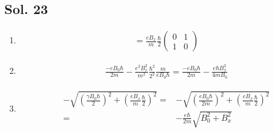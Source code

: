 \subsection*{Sol. 23}
\begin{enumerate}
    \item 
    \begin{align*}
    [H'] = 
    \frac{eB_x}{m}
    \frac{\hbar}{2}
    \begin{pmatrix}
        0 & 1\\
        1 & 0
    \end{pmatrix}
    \end{align*}
    \item 
    \begin{align*}
        \frac{ -eB_0\hbar}{2m} -
        \frac{e^2B^2_x}{m^2}
    \frac{\hbar^2}{2^2}
    \frac{m}{e B_0\hbar}
    =
    \frac{ -eB_0\hbar}{2m} -
    \frac{e\hbar B^2_x}{4mB_0}
    \end{align*}
    \item 
    \begin{align*}
        -\sqrt{
        \left(\frac{\gamma B_0\hbar}{2}
        \right)^2
        +
        \left(\frac{eB_x}{m}
    \frac{\hbar}{2}
    \right)^2
        }  
        =&-\sqrt{
        \left(\frac{e B_0\hbar}{2m}
        \right)^2
        +
        \left(\frac{eB_x}{m}
    \frac{\hbar}{2}
    \right)^2
        }  \\
        =&
        -\frac{e\hbar}{2m}
        \sqrt{B_0^2+B_x^2}
    \end{align*}
\end{enumerate}

